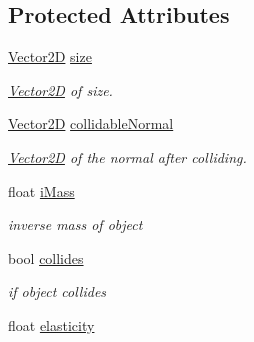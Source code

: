 \subsection*{Protected Attributes}
\begin{DoxyCompactItemize}
\item 
\hypertarget{class_collidable_a095bc78f96536b4e916be33572c8dd1c}{\hyperlink{class_vector2_d}{Vector2\-D} \hyperlink{class_collidable_a095bc78f96536b4e916be33572c8dd1c}{size}}\label{class_collidable_a095bc78f96536b4e916be33572c8dd1c}

\begin{DoxyCompactList}\small\item\em \hyperlink{class_vector2_d}{Vector2\-D} of size. \end{DoxyCompactList}\item 
\hypertarget{class_collidable_a51eb6296224596bfad036f0e34dc41b0}{\hyperlink{class_vector2_d}{Vector2\-D} \hyperlink{class_collidable_a51eb6296224596bfad036f0e34dc41b0}{collidable\-Normal}}\label{class_collidable_a51eb6296224596bfad036f0e34dc41b0}

\begin{DoxyCompactList}\small\item\em \hyperlink{class_vector2_d}{Vector2\-D} of the normal after colliding. \end{DoxyCompactList}\item 
\hypertarget{class_collidable_a85f5a00fbcdfab680becf9a79d3de479}{float \hyperlink{class_collidable_a85f5a00fbcdfab680becf9a79d3de479}{i\-Mass}}\label{class_collidable_a85f5a00fbcdfab680becf9a79d3de479}

\begin{DoxyCompactList}\small\item\em inverse mass of object \end{DoxyCompactList}\item 
\hypertarget{class_collidable_ab8864fc6bc92c01b7236ce4f4807f584}{bool \hyperlink{class_collidable_ab8864fc6bc92c01b7236ce4f4807f584}{collides}}\label{class_collidable_ab8864fc6bc92c01b7236ce4f4807f584}

\begin{DoxyCompactList}\small\item\em if object collides \end{DoxyCompactList}\item 
\hypertarget{class_collidable_a39bc3c72d8cf92642e98b1c174d3d2e6}{float \hyperlink{class_collidable_a39bc3c72d8cf92642e98b1c174d3d2e6}{elasticity}}\label{class_collidable_a39bc3c72d8cf92642e98b1c174d3d2e6}


\end{DoxyCompactItemize}

